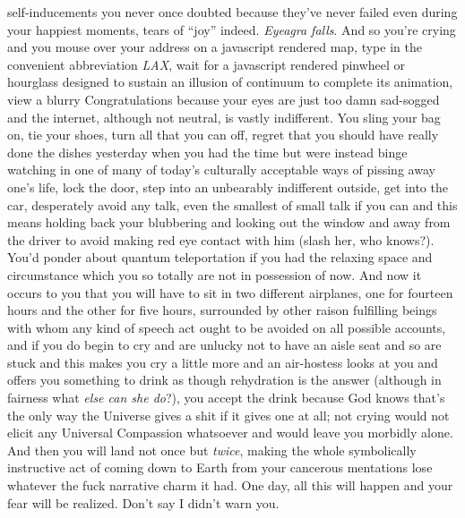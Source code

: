 \documentclass{article}
\begin{document}
self-inducements you never once doubted because they've never failed
even during your happiest moments, tears of ``joy'' indeed.
\textit{Eyeagra falls}. And so you're crying and you mouse over your
address on a javascript rendered map, type in the convenient
abbreviation \textit{LAX}, wait for a javascript rendered pinwheel or
hourglass designed to sustain an illusion of continuum to complete its
animation, view a blurry Congratulations because your eyes are just too
damn sad-sogged and the internet, although not neutral, is vastly
indifferent. You sling your bag on, tie your shoes, turn all that you
can off, regret that you should have really done the dishes yesterday
when you had the time but were instead binge watching in one of many of
today's culturally acceptable ways of pissing away one's life, lock the
door, step into an unbearably indifferent outside, get into the car,
desperately avoid any talk, even the smallest of small talk if you can
and this means holding back your blubbering and looking out the window
and away from the driver to avoid making red eye contact with him (slash
her, who knows?). You'd ponder about quantum teleportation if you had
the relaxing space and circumstance which you so totally are not in
possession of now. And now it occurs to you that you will have to sit in
two different airplanes, one for fourteen hours and the other for five
hours, surrounded by other raison fulfilling beings with whom any kind
of speech act ought to be avoided on all possible accounts, and if you
do begin to cry and are unlucky not to have an aisle seat and so are
stuck and this makes you cry a little more and an air-hostess looks at
you and offers you something to drink as though rehydration is the
answer (although in fairness what \textit{else can she do}?), you accept
the drink because God knows that's the only way the Universe gives
a shit if it gives one at all; not crying would not elicit any Universal
Compassion whatsoever and would leave you morbidly alone. And then you
will land not once but \textit{twice}, making the whole symbolically
instructive act of coming down to Earth from your cancerous mentations
lose whatever the fuck narrative charm it had. One day, all this will
happen and your fear will be realized. Don't say I didn't warn you.
\end{document}
